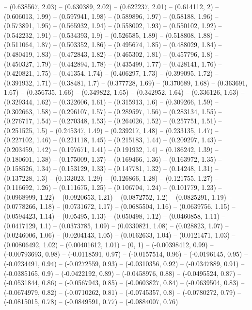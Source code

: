 -- (0.638567, 2.03)
-- (0.630389, 2.02)
-- (0.622237, 2.01)
-- (0.614112, 2)
-- (0.606013, 1.99)
-- (0.597941, 1.98)
-- (0.589896, 1.97)
-- (0.58188, 1.96)
-- (0.573891, 1.95)
-- (0.565932, 1.94)
-- (0.558002, 1.93)
-- (0.550102, 1.92)
-- (0.542232, 1.91)
-- (0.534393, 1.9)
-- (0.526585, 1.89)
-- (0.518808, 1.88)
-- (0.511064, 1.87)
-- (0.503352, 1.86)
-- (0.495674, 1.85)
-- (0.488029, 1.84)
-- (0.480419, 1.83)
-- (0.472843, 1.82)
-- (0.465302, 1.81)
-- (0.457796, 1.8)
-- (0.450327, 1.79)
-- (0.442894, 1.78)
-- (0.435499, 1.77)
-- (0.428141, 1.76)
-- (0.420821, 1.75)
-- (0.41354, 1.74)
-- (0.406297, 1.73)
-- (0.399095, 1.72)
-- (0.391932, 1.71)
-- (0.38481, 1.7)
-- (0.377728, 1.69)
-- (0.370689, 1.68)
-- (0.363691, 1.67)
-- (0.356735, 1.66)
-- (0.349822, 1.65)
-- (0.342952, 1.64)
-- (0.336126, 1.63)
-- (0.329344, 1.62)
-- (0.322606, 1.61)
-- (0.315913, 1.6)
-- (0.309266, 1.59)
-- (0.302663, 1.58)
-- (0.296107, 1.57)
-- (0.289597, 1.56)
-- (0.283134, 1.55)
-- (0.276717, 1.54)
-- (0.270348, 1.53)
-- (0.264026, 1.52)
-- (0.257751, 1.51)
-- (0.251525, 1.5)
-- (0.245347, 1.49)
-- (0.239217, 1.48)
-- (0.233135, 1.47)
-- (0.227102, 1.46)
-- (0.221118, 1.45)
-- (0.215183, 1.44)
-- (0.209297, 1.43)
-- (0.203459, 1.42)
-- (0.197671, 1.41)
-- (0.191932, 1.4)
-- (0.186242, 1.39)
-- (0.180601, 1.38)
-- (0.175009, 1.37)
-- (0.169466, 1.36)
-- (0.163972, 1.35)
-- (0.158526, 1.34)
-- (0.153129, 1.33)
-- (0.147781, 1.32)
-- (0.14248, 1.31)
-- (0.137228, 1.3)
-- (0.132023, 1.29)
-- (0.126866, 1.28)
-- (0.121755, 1.27)
-- (0.116692, 1.26)
-- (0.111675, 1.25)
-- (0.106704, 1.24)
-- (0.101779, 1.23)
-- (0.0968999, 1.22)
-- (0.0920653, 1.21)
-- (0.0872752, 1.2)
-- (0.0825291, 1.19)
-- (0.0778266, 1.18)
-- (0.0731672, 1.17)
-- (0.0685504, 1.16)
-- (0.0639756, 1.15)
-- (0.0594423, 1.14)
-- (0.05495, 1.13)
-- (0.050498, 1.12)
-- (0.0460858, 1.11)
-- (0.0417129, 1.1)
-- (0.0373785, 1.09)
-- (0.0330821, 1.08)
-- (0.028823, 1.07)
-- (0.0246006, 1.06)
-- (0.0204143, 1.05)
-- (0.0162633, 1.04)
-- (0.0121471, 1.03)
-- (0.00806492, 1.02)
-- (0.00401612, 1.01)
-- (0, 1)
-- (-0.00398412, 0.99)
-- (-0.00793693, 0.98)
-- (-0.0118591, 0.97)
-- (-0.0157514, 0.96)
-- (-0.0196145, 0.95)
-- (-0.0234491, 0.94)
-- (-0.0272559, 0.93)
-- (-0.0310356, 0.92)
-- (-0.0347889, 0.91)
-- (-0.0385165, 0.9)
-- (-0.0422192, 0.89)
-- (-0.0458976, 0.88)
-- (-0.0495524, 0.87)
-- (-0.0531844, 0.86)
-- (-0.0567943, 0.85)
-- (-0.0603827, 0.84)
-- (-0.0639504, 0.83)
-- (-0.0674979, 0.82)
-- (-0.0710262, 0.81)
-- (-0.0745357, 0.8)
-- (-0.0780272, 0.79)
-- (-0.0815015, 0.78)
-- (-0.0849591, 0.77)
-- (-0.0884007, 0.76)
